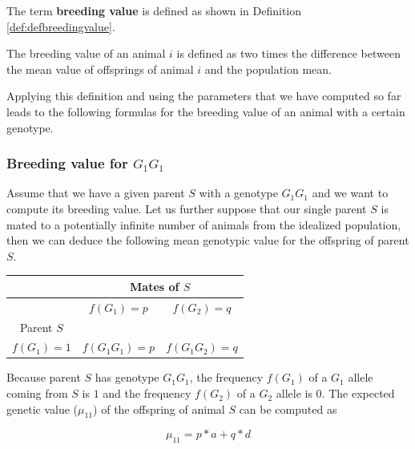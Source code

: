 \documentclass[]{book}
\theoremstyle{definition}
\theoremstyle{definition}
\theoremstyle{definition}
\theoremstyle{remark}
\let\BeginKnitrBlock\begin \let\EndKnitrBlock\end
\begin{document}
The term \textbf{breeding value} is defined as shown in Definition \ref{def:defbreedingvalue}.

\BeginKnitrBlock{definition}[Breeding Value]
\protect\hypertarget{def:defbreedingvalue}{}{\label{def:defbreedingvalue} {} }The breeding value of an animal \(i\) is defined as two times the difference between the mean value of offsprings of animal \(i\) and the population mean.
\EndKnitrBlock{definition}

Applying this definition and using the parameters that we have computed so far leads to the following formulas for the breeding value of an animal with a certain genotype.

\hypertarget{breeding-value-for-g_1g_1}{%
\subsubsection{\texorpdfstring{Breeding value for \(G_1G_1\)}{Breeding value for G\_1G\_1}}\label{breeding-value-for-g_1g_1}}

Assume that we have a given parent \(S\) with a genotype \(G_1G_1\) and we want to compute its breeding value. Let us further suppose that our single parent \(S\) is mated to a potentially infinite number of animals from the idealized population, then we can deduce the following mean genotypic value for the offspring of parent \(S\).

\vspace{5ex}

\begin{tabular}{|c|c|c|}
\hline
& \multicolumn{2}{|c|}{Mates of $S$} \\
\hline
& $f(G_1) = p$       &  $f(G_2) = q$   \\
\hline
Parent $S$       &                    &                 \\
\hline
$f(G_1) = 1$ &  $f(G_1G_1) = p$   &  $f(G_1G_2) = q$\\
\hline
\end{tabular}

\vspace{5ex}

Because parent \(S\) has genotype \(G_1G_1\), the frequency \(f(G_1)\) of a \(G_1\) allele coming from \(S\) is \(1\) and the frequency \(f(G_2)\) of a \(G_2\) allele is 0. The expected genetic value (\(\mu_{11}\)) of the offspring of animal \(S\) can be computed as

\begin{equation}
\mu_{11} = p*a + q*d
\label{eq:MeanOffGen11}
\end{equation}
\end{document}
